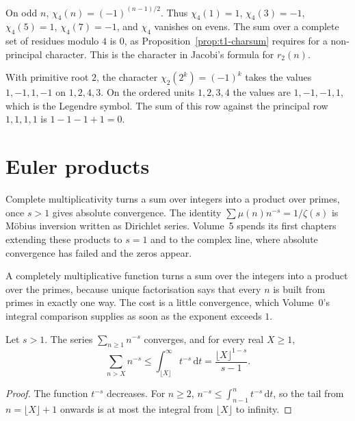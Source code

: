 \begin{examplex}
On odd $n$, $\chi_4(n)=(-1)^{(n-1)/2}$. Thus $\chi_4(1)=1$, $\chi_4(3)=-1$, $\chi_4(5)=1$, $\chi_4(7)=-1$, and $\chi_4$ vanishes on evens. The sum over a complete set of residues modulo $4$ is $0$, as Proposition~\ref{prop:t1-charsum} requires for a non-principal character. This is the character in Jacobi's formula for $r_2(n)$.
\end{examplex}

\begin{examplex}
With primitive root $2$, the character $\chi_2(2^k)=(-1)^k$ takes the values $1,-1,1,-1$ on $1,2,4,3$. On the ordered units $1,2,3,4$ the values are $1,-1,-1,1$, which is the Legendre symbol. The sum of this row against the principal row $1,1,1,1$ is $1-1-1+1=0$.
\end{examplex}

\section{Euler products}

Complete multiplicativity turns a sum over integers into a product over primes, once $s>1$ gives absolute convergence. The identity $\sum\mu(n)n^{-s}=1/\zeta(s)$ is M\"obius inversion written as Dirichlet series. Volume~5 spends its first chapters extending these products to $s=1$ and to the complex line, where absolute convergence has failed and the zeros appear.

A completely multiplicative function turns a sum over the integers into a product over the primes, because unique factorisation says that every $n$ is built from primes in exactly one way. The cost is a little convergence, which Volume~0's integral comparison supplies as soon as the exponent exceeds $1$.

\begin{lemma}\label{lem:t1-pseries}
Let $s>1$. The series $\sum_{n\ge1}n^{-s}$ converges, and for every real $X\ge1$,
\[
\sum_{n>X}n^{-s}\le\int_{\lfloor X\rfloor}^{\infty}t^{-s}\,\mathrm dt=\frac{\lfloor X\rfloor^{1-s}}{s-1}.
\]
\end{lemma}
\begin{proof}
The function $t^{-s}$ decreases. For $n\ge2$, $n^{-s}\le\int_{n-1}^n t^{-s}\,\mathrm dt$, so the tail from $n=\lfloor X\rfloor+1$ onwards is at most the integral from $\lfloor X\rfloor$ to infinity.
\end{proof}

